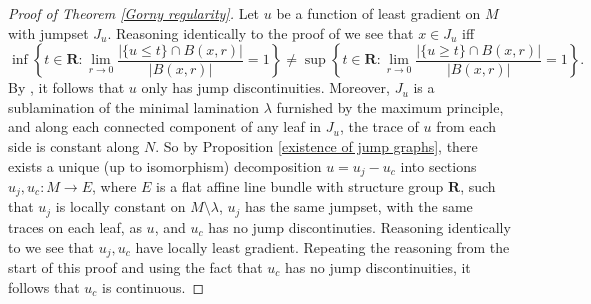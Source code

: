 \documentclass[reqno,10pt]{amsart}
\newcommand{\RR}{\mathbf{R}}
\theoremstyle{definition}
\numberwithin{equation}{section}
\begin{document}
\begin{proof}[Proof of Theorem \ref{Gorny regularity}]
Let $u$ be a function of least gradient on $M$ with jumpset $J_u$.
Reasoning identically to the proof of \cite[Proposition 3.9]{górny2017planar} we see that $x \in J_u$ iff
$$\inf\left\{t \in \RR: \lim_{r \to 0} \frac{|\{u \leq t\} \cap B(x, r)|}{|B(x, r)|} = 1\right\} \neq \sup\left\{t \in \RR: \lim_{r \to 0} \frac{|\{u \geq t\} \cap B(x, r)|}{|B(x, r)|} = 1\right\}.$$
By \cite[Theorem 4.1]{HakkarainenKorteLahtiShanmugalingam+2015}, it follows that $u$ only has jump discontinuities.
Moreover, $J_u$ is a sublamination of the minimal lamination $\lambda$ furnished by the maximum principle, and along each connected component of any leaf in $J_u$, the trace of $u$ from each side is constant along $N$.
So by Proposition \ref{existence of jump graphs}, there exists a unique (up to isomorphism) decomposition $u = u_j - u_c$ into sections $u_j, u_c: M \to E$, where $E$ is a flat affine line bundle with structure group $\RR$, such that $u_j$ is locally constant on $M \setminus \lambda$, $u_j$ has the same jumpset, with the same traces on each leaf, as $u$, and $u_c$ has no jump discontinuties.
Reasoning identically to \cite[pg11]{górny2017planar} we see that $u_j, u_c$ have locally least gradient.
Repeating the reasoning from the start of this proof and using the fact that $u_c$ has no jump discontinuities, it follows that $u_c$ is continuous.
\end{proof}


\end{document}
